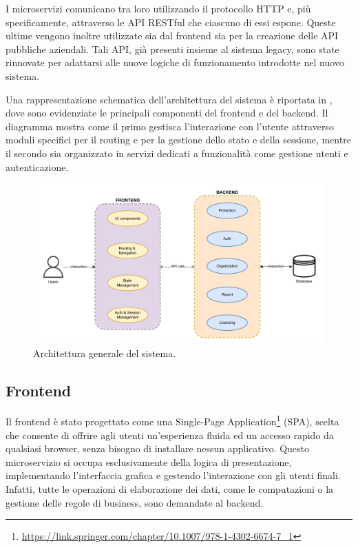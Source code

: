 I microservizi comunicano tra loro utilizzando il protocollo HTTP e, più specificamente, attraverso le API RESTful che ciascuno di essi espone. Queste ultime vengono inoltre utilizzate sia dal frontend sia per la creazione delle API pubbliche aziendali. Tali API, già presenti insieme al sistema legacy, sono state rinnovate per adattarsi alle nuove logiche di funzionamento introdotte nel nuovo sistema.

Una rappresentazione schematica dell'architettura del sistema è riportata in , dove sono evidenziate le principali componenti del frontend e del backend. Il diagramma mostra come il primo gestisca l'interazione con l'utente attraverso moduli specifici per il routing e per la gestione dello stato e della sessione, mentre il secondo sia organizzato in servizi dedicati a funzionalità come gestione utenti e autenticazione.

\begin{figure}
  \centering
  \includegraphics[width=1\textwidth]{figures/system-architecture.pdf}
  \caption{Architettura generale del sistema.}
  \label{fig:system-architecture}
\end{figure}

\subsection{Frontend}
Il frontend è stato progettato come una Single-Page Application\footnote{\url{https://link.springer.com/chapter/10.1007/978-1-4302-6674-7_1}} (SPA), scelta che consente di offrire agli utenti un'esperienza fluida ed un accesso rapido da qualsiasi browser, senza bisogno di installare nessun applicativo. Questo microservizio si occupa esclusivamente della logica di presentazione, implementando l'interfaccia grafica e gestendo l'interazione con gli utenti finali. Infatti, tutte le operazioni di elaborazione dei dati, come le computazioni o la gestione delle regole di business, sono demandate al backend.

